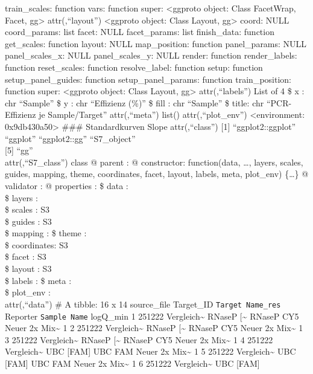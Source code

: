 \documentclass[
]{article}
\begin{document}
train\_scales: function vars: function super: \textless ggproto object:
Class FacetWrap, Facet, gg\textgreater{} attr(,``layout'')
\textless ggproto object: Class Layout, gg\textgreater{} coord: NULL
coord\_params: list facet: NULL facet\_params: list finish\_data:
function get\_scales: function layout: NULL map\_position: function
panel\_params: NULL panel\_scales\_x: NULL panel\_scales\_y: NULL
render: function render\_labels: function reset\_scales: function
resolve\_label: function setup: function setup\_panel\_guides: function
setup\_panel\_params: function train\_position: function super:
\textless ggproto object: Class Layout, gg\textgreater{}
attr(,``labels'') List of 4 \$ x : chr ``Sample'' \$ y : chr ``Effizienz
(\%)'' \$ fill : chr ``Sample'' \$ title: chr ``PCR-Effizienz je
Sample/Target'' attr(,``meta'') list() attr(,``plot\_env'')
\textless environment: 0x9db430a50\textgreater{} \n\#\#\# Standardkurven
Slope \n\n attr(,``class'') {[}1{]} ``ggplot2::ggplot'' ``ggplot''
``ggplot2::gg'' ``S7\_object''\\
{[}5{]} ``gg''\\
attr(,``S7\_class'') class @ parent : @ constructor: function(data,
\ldots, layers, scales, guides, mapping, theme, coordinates, facet,
layout, labels, meta, plot\_env) \{\ldots\} @ validator : @ properties :
\$ data : \\
\$ layers : \\
\$ scales : S3\\
\$ guides : S3\\
\$ mapping : \$ theme : \\
\$ coordinates: S3\\
\$ facet : S3\\
\$ layout : S3\\
\$ labels : \$ meta : \\
\$ plot\_env : \\
attr(,``data'') \# A tibble: 16 x 14 source\_file Target\_ID
\texttt{Target\ Name\_res} Reporter \texttt{Sample\ Name} logQ\_min 1
251222 Vergleich\textasciitilde{} RNaseP {[}\textasciitilde{} RNaseP CY5
Neuer 2x Mix\textasciitilde{} 1 2 251222 Vergleich\textasciitilde{}
RNaseP {[}\textasciitilde{} RNaseP CY5 Neuer 2x Mix\textasciitilde{} 1 3
251222 Vergleich\textasciitilde{} RNaseP {[}\textasciitilde{} RNaseP CY5
Neuer 2x Mix\textasciitilde{} 1 4 251222 Vergleich\textasciitilde{} UBC
{[}FAM{]} UBC FAM Neuer 2x Mix\textasciitilde{} 1 5 251222
Vergleich\textasciitilde{} UBC {[}FAM{]} UBC FAM Neuer 2x
Mix\textasciitilde{} 1 6 251222 Vergleich\textasciitilde{} UBC {[}FAM{]}
\end{document}
